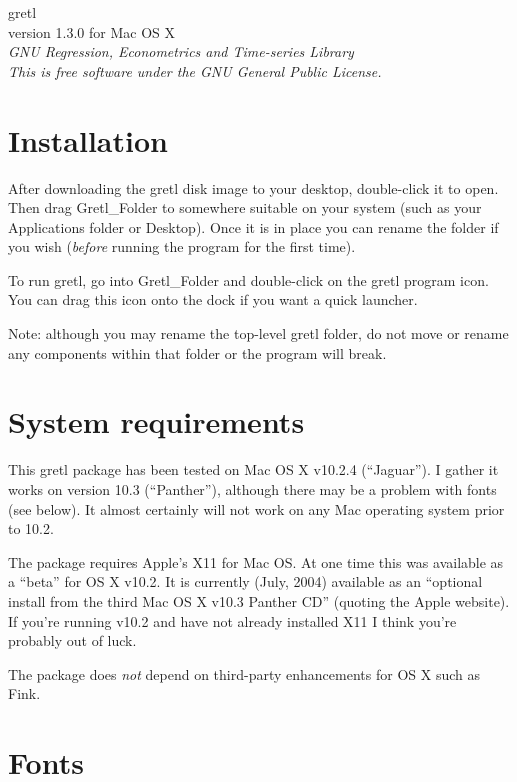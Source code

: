 \documentclass[11pt]{article}
\begin{document}
\begin{center}
{\color{gold} \titlefont gretl} \\[1ex]
version 1.3.0 for Mac OS X \\[2ex]

\textit{GNU Regression, Econometrics and Time-series Library\\
  This is free software under the GNU General Public License.}

\end{center}

\section{Installation}
\label{sec:install}

After downloading the gretl disk image to your desktop, double-click it
to open. Then drag \textsf{Gretl\_Folder} to somewhere suitable on your
system (such as your Applications folder or Desktop).  Once it is in
place you can rename the folder if you wish (\textit{before} running the
program for the first time).

To run gretl, go into \textsf{Gretl\_Folder} and double-click on the
gretl program icon.  You can drag this icon onto the dock if you want
a quick launcher.  

Note: although you may rename the top-level gretl folder, do not move
or rename any components within that folder or the program will break.

\section{System requirements}
\label{sec:os}

This gretl package has been tested on Mac OS X v10.2.4 (``Jaguar'').
I gather it works on version 10.3 (``Panther''), although there may be
a problem with fonts (see below).  It almost certainly will
not work on any Mac operating system prior to 10.2.

The package requires Apple's X11 for Mac OS.  At one time this was
available as a ``beta'' for OS X v10.2.  It is currently (July, 2004)
available as an ``optional install from the third Mac OS X v10.3
Panther CD'' (quoting the Apple website).  If you're running v10.2 and
have not already installed X11 I think you're probably out of luck.

The package does \textit{not} depend on third-party enhancements for
OS X such as \textsf{Fink}.

\section{Fonts}
\label{sec:fonts}
\end{document}
